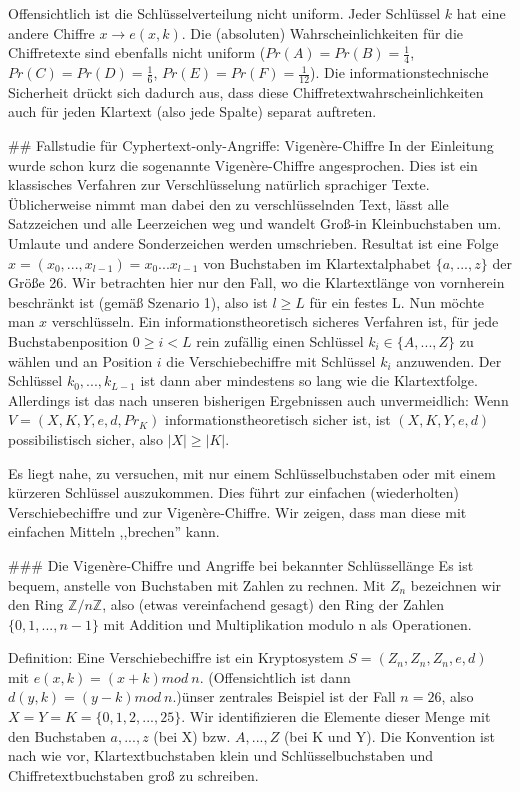 \documentclass[a4paper]{article}
\begin{document}
\begin{multicols}{3}
        Offensichtlich ist die Schlüsselverteilung nicht uniform. Jeder Schlüssel $k$ hat eine andere Chiffre $x\rightarrow e(x,k)$. Die (absoluten) Wahrscheinlichkeiten für die Chiffretexte sind ebenfalls nicht uniform ($Pr(A)=Pr(B)=\frac{1}{4}$, $Pr(C)=Pr(D)=\frac{1}{6}$, $Pr(E)=Pr(F)=\frac{1}{12}$).
        Die informationstechnische Sicherheit drückt sich dadurch aus, dass diese Chiffretextwahrscheinlichkeiten auch für jeden Klartext (also jede Spalte) separat auftreten.

        ## Fallstudie für Cyphertext-only-Angriffe: Vigenère-Chiffre
        In der Einleitung wurde schon kurz die sogenannte Vigenère-Chiffre angesprochen. Dies ist ein klassisches Verfahren zur Verschlüsselung natürlich sprachiger Texte. Üblicherweise nimmt man dabei den zu verschlüsselnden Text, lässt alle Satzzeichen und alle Leerzeichen weg und wandelt Groß-in Kleinbuchstaben um. Umlaute und andere Sonderzeichen werden umschrieben. Resultat ist eine Folge $x=(x_0,...,x_{l-1})=x_0 ...x_{l-1}$ von Buchstaben im Klartextalphabet $\{a,...,z\}$ der Größe 26. Wir betrachten hier nur den Fall, wo die Klartextlänge von vornherein beschränkt ist (gemäß Szenario 1), also ist $l\geq L$ für ein festes L. Nun möchte man $x$ verschlüsseln. Ein informationstheoretisch sicheres Verfahren ist, für jede Buchstabenposition $0\geq i < L$ rein zufällig einen Schlüssel $k_i\in\{A,...,Z\}$ zu wählen und an Position $i$ die Verschiebechiffre mit Schlüssel $k_i$ anzuwenden. Der Schlüssel $k_0,...,k_{L-1}$ ist dann aber mindestens so lang wie die Klartextfolge. Allerdings ist das nach unseren bisherigen Ergebnissen auch unvermeidlich: Wenn $V=(X,K,Y,e,d,Pr_K)$ informationstheoretisch sicher ist, ist $(X,K,Y,e,d)$ possibilistisch sicher, also $|X|\geq |K|$.

        Es liegt nahe, zu versuchen, mit nur einem Schlüsselbuchstaben oder mit einem kürzeren Schlüssel auszukommen. Dies führt zur einfachen (wiederholten) Verschiebechiffre und zur Vigenère-Chiffre. Wir zeigen, dass man diese mit einfachen Mitteln ,,brechen'' kann.

        ### Die Vigenère-Chiffre und Angriffe bei bekannter Schlüssellänge
        Es ist bequem, anstelle von Buchstaben mit Zahlen zu rechnen. Mit $Z_n$ bezeichnen wir den Ring $\mathbb{Z}/n\mathbb{Z}$, also (etwas vereinfachend gesagt) den Ring der Zahlen $\{0,1,...,n-1\}$ mit Addition und Multiplikation modulo n als Operationen.

        Definition: Eine Verschiebechiffre ist ein Kryptosystem $S=(Z_n,Z_n,Z_n,e,d)$ mit $e(x,k)=(x+k) mod\ n$. (Offensichtlich ist dann $d(y,k)=(y-k)mod\ n$.)ünser zentrales Beispiel ist der Fall $n=26$, also $X=Y=K=\{0,1,2,...,25\}$. Wir identifizieren die Elemente dieser Menge mit den Buchstaben $a,...,z$ (bei X) bzw. $A,...,Z$ (bei K und Y). Die Konvention ist nach wie vor, Klartextbuchstaben klein und Schlüsselbuchstaben und Chiffretextbuchstaben groß zu schreiben.


\end{multicols}
\end{document}
